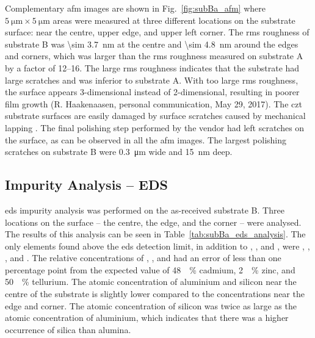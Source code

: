 Complementary \ac{afm} images are shown in Fig.~\ref{fig:subBa_afm} where $\SI{5}{\micro\metre}\times\SI{5}{\micro\metre}$ areas were measured at three different locations on the substrate surface: near the centre, upper edge, and upper left corner. The \ac{rms} roughness of substrate B was \SI{\sim 3.7}{\nano\metre} at the centre and \SI{\sim 4.8}{\nano\metre} around the edges and corners, which was larger than the \ac{rms} roughness measured on substrate A by a factor of \SIrange{12}{16}{}. The large \ac{rms} roughness indicates that the substrate had large scratches and was inferior to substrate A. With too large \ac{rms} roughness, the surface appears 3-dimensional instead of 2-dimensional, resulting in poorer film growth (R. Haakenaasen, personal communication, May 29, 2017). The \ac{czt} substrate surfaces are easily damaged by surface scratches caused by mechanical lapping \citep{egan2009scanning}. The final polishing step performed by the vendor had left scratches on the surface, as can be observed in all the \ac{afm} images. The largest polishing scratches on substrate B were \SI{0.3}{\micro\metre} wide and \SI{15}{\nano\metre} deep.




\subsection{Impurity Analysis -- EDS}

\Ac{eds} impurity analysis was performed on the as-received substrate B. Three locations on the surface -- the centre, the edge, and the corner -- were analysed. The results of this analysis can be seen in Table~\ref{tab:subBa_eds_analysis}. The only elements found above the \ac{eds} detection limit, in addition to , , and , were , , , and . The relative concentrations of , , and  had an error of less than one percentage point from the expected value of \SI{48}{\atomic\percent} cadmium, \SI{2}{\atomic\percent} zinc, and \SI{50}{\atomic\percent} tellurium. The atomic concentration of aluminium and silicon near the centre of the substrate is slightly lower compared to the concentrations near the edge and corner. The atomic concentration of silicon was twice as large as the atomic concentration of aluminium, which indicates that there was a higher occurrence of silica than alumina.

